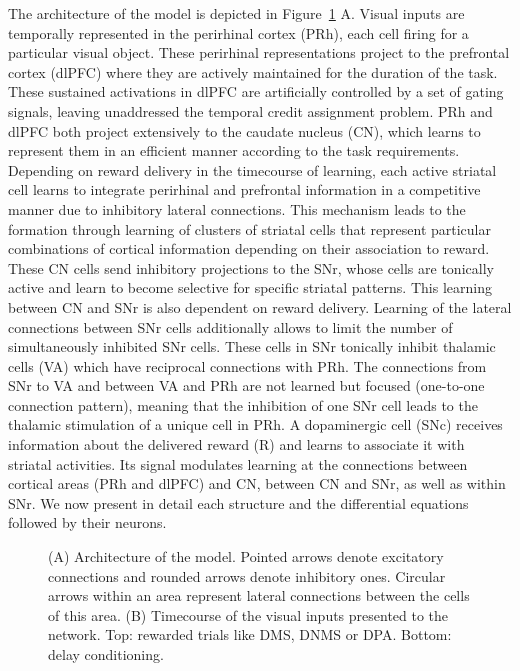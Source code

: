 \documentclass[
  11pt,
  a4paper,
]{scrbook}
\begin{document}
The architecture of the model is depicted in Figure~\ref{fig-ficn:model}
A. Visual inputs are temporally represented in the perirhinal cortex
(PRh), each cell firing for a particular visual object. These perirhinal
representations project to the prefrontal cortex (dlPFC) where they are
actively maintained for the duration of the task. These sustained
activations in dlPFC are artificially controlled by a set of gating
signals, leaving unaddressed the temporal credit assignment problem. PRh
and dlPFC both project extensively to the caudate nucleus (CN), which
learns to represent them in an efficient manner according to the task
requirements. Depending on reward delivery in the timecourse of
learning, each active striatal cell learns to integrate perirhinal and
prefrontal information in a competitive manner due to inhibitory lateral
connections. This mechanism leads to the formation through learning of
clusters of striatal cells that represent particular combinations of
cortical information depending on their association to reward. These CN
cells send inhibitory projections to the SNr, whose cells are tonically
active and learn to become selective for specific striatal patterns.
This learning between CN and SNr is also dependent on reward delivery.
Learning of the lateral connections between SNr cells additionally
allows to limit the number of simultaneously inhibited SNr cells. These
cells in SNr tonically inhibit thalamic cells (VA) which have reciprocal
connections with PRh. The connections from SNr to VA and between VA and
PRh are not learned but focused (one-to-one connection pattern), meaning
that the inhibition of one SNr cell leads to the thalamic stimulation of
a unique cell in PRh. A dopaminergic cell (SNc) receives information
about the delivered reward (R) and learns to associate it with striatal
activities. Its signal modulates learning at the connections between
cortical areas (PRh and dlPFC) and CN, between CN and SNr, as well as
within SNr. We now present in detail each structure and the differential
equations followed by their neurons.

\begin{figure}


\caption{\label{fig-ficn:model}(A) Architecture of the model. Pointed
arrows denote excitatory connections and rounded arrows denote
inhibitory ones. Circular arrows within an area represent lateral
connections between the cells of this area. (B) Timecourse of the visual
inputs presented to the network. Top: rewarded trials like DMS, DNMS or
DPA. Bottom: delay conditioning.}

\end{figure}%
\end{document}
